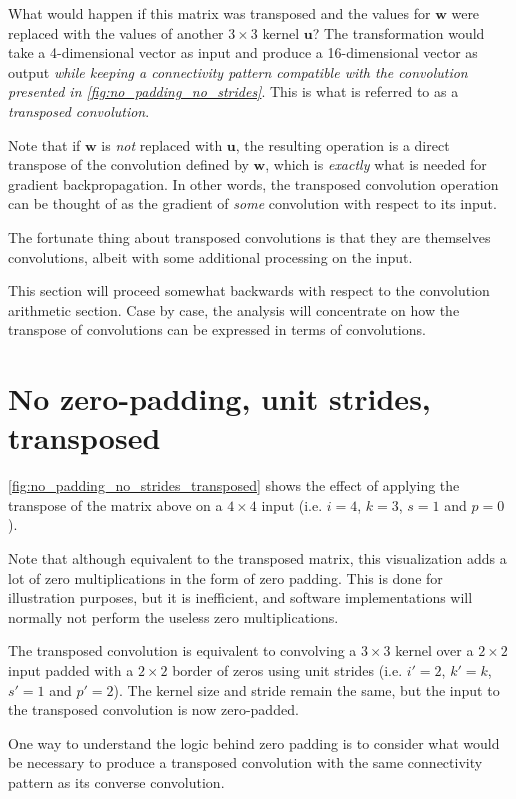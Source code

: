 \documentclass{report}
\begin{document}
What would happen if this matrix was transposed and the values for $\mathbf{w}$
were replaced with the values of another $3 \times 3$ kernel $\mathbf{u}$? The
transformation would take a 4-dimensional vector as input and produce a
16-dimensional vector as output {\em while keeping a connectivity pattern
compatible with the convolution presented in
\autoref{fig:no_padding_no_strides}}. This is what is referred to as a {\em
transposed convolution}.

Note that if $\mathbf{w}$ is {\em not} replaced with $\mathbf{u}$, the resulting
operation is a direct transpose of the convolution defined by $\mathbf{w}$,
which is {\em exactly} what is needed for gradient backpropagation. In other
words, the transposed convolution operation can be thought of as the gradient of
{\em some} convolution with respect to its input.

The fortunate thing about transposed convolutions is that they are themselves
convolutions, albeit with some additional processing on the input.

This section will proceed somewhat backwards with respect to the convolution
arithmetic section. Case by case, the analysis will concentrate on how the
transpose of convolutions can be expressed in terms of convolutions.

\section{No zero-padding, unit strides, transposed}

\autoref{fig:no_padding_no_strides_transposed} shows the effect of applying the
transpose of the matrix above on a $4 \times 4$ input (i.e. $i = 4$, $k = 3$, $s
= 1$ and $p = 0$).

Note that although equivalent to the transposed matrix, this visualization adds
a lot of zero multiplications in the form of zero padding. This is done for
illustration purposes, but it is inefficient, and software implementations will
normally not perform the useless zero multiplications.

The transposed convolution is equivalent to convolving a $3 \times 3$ kernel
over a $2 \times 2$ input padded with a $2 \times 2$ border of zeros using unit
strides (i.e. $i' = 2$, $k' = k$, $s' = 1$ and $p' = 2$). The kernel size and
stride remain the same, but the input to the transposed convolution is now
zero-padded.

One way to understand the logic behind zero padding is to consider what would be
necessary to produce a transposed convolution with the same connectivity pattern
as its converse convolution.
\end{document}
